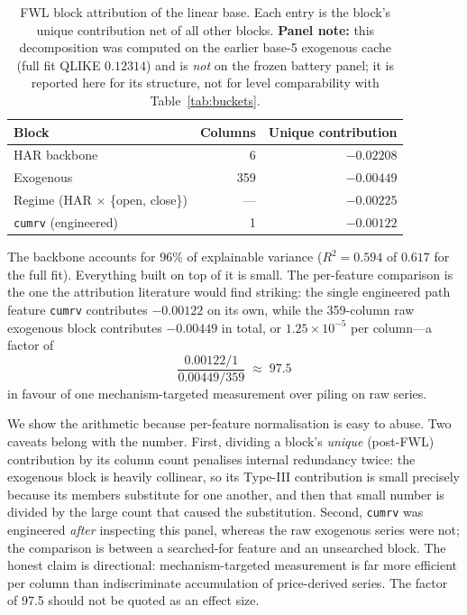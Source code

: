 \begin{table}[H]
\centering
\caption{FWL block attribution of the linear base. Each entry is the block's
unique contribution net of all other blocks. \textbf{Panel note:} this
decomposition was computed on the earlier base-5 exogenous cache (full fit
QLIKE $0.12314$) and is \emph{not} on the frozen battery panel; it is reported
here for its structure, not for level comparability with
Table~\ref{tab:buckets}.}
\label{tab:fwl}
\begin{tabular}{lrr}
\toprule
Block & Columns & Unique contribution \\
\midrule
HAR backbone                  & 6   & $-0.02208$ \\
Exogenous                     & 359 & $-0.00449$ \\
Regime (HAR $\times$ \{open, close\}) & --- & $-0.00225$ \\
\texttt{cumrv} (engineered)   & 1   & $-0.00122$ \\
\bottomrule
\end{tabular}
\end{table}

The backbone accounts for 96\% of explainable variance ($R^2 = 0.594$ of
$0.617$ for the full fit). Everything built on top of it is small. The
per-feature comparison is the one the attribution literature would find
striking: the single engineered path feature \texttt{cumrv} contributes
$-0.00122$ on its own, while the 359-column raw exogenous block contributes
$-0.00449$ in total, or $1.25 \times 10^{-5}$ per column---a factor of
\begin{equation}
  \frac{0.00122 / 1}{0.00449 / 359} \;\approx\; 97.5
  \label{eq:per_feature}
\end{equation}
in favour of one mechanism-targeted measurement over piling on raw series.

We show the arithmetic because per-feature normalisation is easy to abuse. Two
caveats belong with the number. First, dividing a block's \emph{unique}
(post-FWL) contribution by its column count penalises internal redundancy
twice: the exogenous block is heavily collinear, so its Type-III contribution
is small precisely because its members substitute for one another, and then
that small number is divided by the large count that caused the substitution.
Second, \texttt{cumrv} was engineered \emph{after} inspecting this panel,
whereas the raw exogenous series were not; the comparison is between a
searched-for feature and an unsearched block. The honest claim is directional:
mechanism-targeted measurement is far more efficient per column than
indiscriminate accumulation of price-derived series. The factor of 97.5 should
not be quoted as an effect size.

